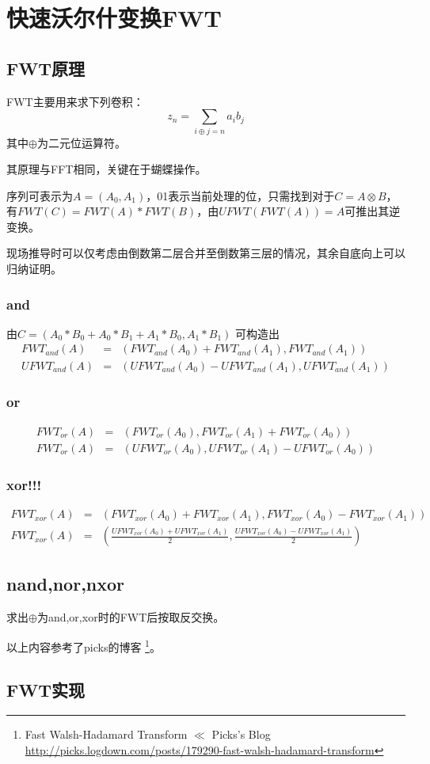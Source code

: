 \section{快速沃尔什变换FWT}
\subsection{FWT原理}
FWT主要用来求下列卷积：
\begin{displaymath}
    z_n=\sum_{i\oplus j=n}{a_ib_j}
\end{displaymath}
其中$\oplus$为二元位运算符。

其原理与FFT相同，关键在于蝴蝶操作。

序列可表示为$A=(A_0,A_1)$，01表示当前处理的位，只需找到对于$C=A\otimes B$，
有$FWT(C)=FWT(A)*FWT(B)$，由$UFWT(FWT(A))=A$可推出其逆变换。


现场推导时可以仅考虑由倒数第二层合并至倒数第三层的情况，其余自底向上可以归纳证明。

\subsubsection{and}
由$C=(A_0*B_0+A_0*B_1+A_1*B_0,A_1*B_1)$
可构造出
\begin{eqnarray*}
    FWT_{and}(A)&=&(FWT_{and}(A_0)+FWT_{and}(A_1),FWT_{and}(A_1))\\
    UFWT_{and}(A)&=&(UFWT_{and}(A_0)-UFWT_{and}(A_1),UFWT_{and}(A_1))
\end{eqnarray*}
\subsubsection{or}
\begin{eqnarray*}
    FWT_{or}(A)&=&(FWT_{or}(A_0),FWT_{or}(A_1)+FWT_{or}(A_0))\\
    FWT_{or}(A)&=&(UFWT_{or}(A_0),UFWT_{or}(A_1)-UFWT_{or}(A_0))
\end{eqnarray*}
\subsubsection{xor!!!}
\begin{eqnarray*}
    FWT_{xor}(A)&=&(FWT_{xor}(A_0)+FWT_{xor}(A_1),FWT_{xor}(A_0)-FWT_{xor}(A_1))\\
    FWT_{xor}(A)&=&\left(\frac{UFWT_{xor}(A_0)+UFWT_{xor}(A_1)}{2},
    \frac{UFWT_{xor}(A_0)-UFWT_{xor}(A_1)}{2}\right)
\end{eqnarray*}
\subsection{nand,nor,nxor}
求出$\oplus$为and,or,xor时的FWT后按取反交换。

以上内容参考了picks的博客
\footnote{Fast Walsh-Hadamard Transform $\ll$ Picks's Blog
    \url{http://picks.logdown.com/posts/179290-fast-walsh-hadamard-transform}}。
\subsection{FWT实现}

